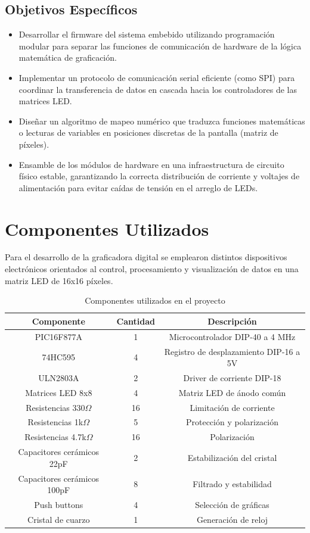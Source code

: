 \subsection{Objetivos Específicos}
\begin{itemize}
    \item Desarrollar el firmware del sistema embebido utilizando programación modular para separar las funciones de comunicación de hardware de la lógica matemática de graficación.
    \item Implementar un protocolo de comunicación serial eficiente (como SPI) para coordinar la transferencia de datos en cascada hacia los controladores de las matrices LED.
    \item Diseñar un algoritmo de mapeo numérico que traduzca funciones matemáticas o lecturas de variables en posiciones discretas de la pantalla (matriz de píxeles).
    \item Ensamble de los módulos de hardware en una infraestructura de circuito físico estable, garantizando la correcta distribución de corriente y voltajes de alimentación para evitar caídas de tensión en el arreglo de LEDs.
\end{itemize}

    \section{Componentes Utilizados}

Para el desarrollo de la graficadora digital se emplearon distintos dispositivos electrónicos orientados al control, procesamiento y visualización de datos en una matriz LED de 16x16 píxeles.

\begin{table}[H]
\centering
\begin{tabular}{|c|c|c|}
\hline
\textbf{Componente} & \textbf{Cantidad} & \textbf{Descripción} \\
\hline
PIC16F877A & 1 & Microcontrolador DIP-40 a 4 MHz \\
\hline
74HC595 & 4 & Registro de desplazamiento DIP-16 a 5V \\
\hline
ULN2803A & 2 & Driver de corriente DIP-18 \\
\hline
Matrices LED 8x8 & 4 & Matriz LED de ánodo común \\
\hline
Resistencias 330$\Omega$ & 16 & Limitación de corriente \\
\hline
Resistencias 1k$\Omega$ & 5 & Protección y polarización \\
\hline
Resistencias 4.7k$\Omega$ & 16 & Polarización \\
\hline
Capacitores cerámicos 22pF & 2 & Estabilización del cristal \\
\hline
Capacitores cerámicos 100pF & 8 & Filtrado y estabilidad \\
\hline
Push buttons & 4 & Selección de gráficas \\
\hline
Cristal de cuarzo & 1 & Generación de reloj \\
\hline
\end{tabular}
\caption{Componentes utilizados en el proyecto}
\end{table}

